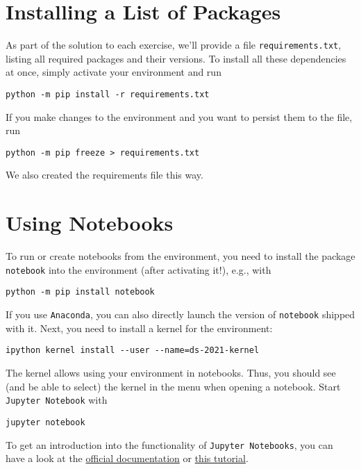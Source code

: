 \documentclass[12pt]{article}
\newcommand{\code}[1]{\textcolor{kitgreen}{\texttt{#1}}}
\begin{document}
\section{Installing a List of Packages}

As part of the solution to each exercise, we'll provide a file \code{requirements.txt}, listing all required packages and their versions.
To install all these dependencies at once, simply activate your environment and run
%
\begin{lstlisting}[style=cmdblock]
python -m pip install -r requirements.txt
\end{lstlisting}
%
If you make changes to the environment and you want to persist them to the file, run
%
\begin{lstlisting}[style=cmdblock]
python -m pip freeze > requirements.txt
\end{lstlisting}
%
We also created the requirements file this way.

\section{Using Notebooks}
\label{sec:notebooks}

To run or create notebooks from the environment, you need to install the package \code{notebook} into the environment (after activating it!), e.g., with
%
\begin{lstlisting}[style=cmdblock]
python -m pip install notebook
\end{lstlisting}
%
If you use \code{Anaconda}, you can also directly launch the version of \code{notebook} shipped with it.
Next, you need to install a kernel for the environment:
%
\begin{lstlisting}[style=cmdblock]
ipython kernel install --user --name=ds-2021-kernel
\end{lstlisting}
%
The kernel allows using your environment in notebooks.
Thus, you should see (and be able to select) the kernel in the menu when opening a notebook.
Start \code{Jupyter Notebook} with
%
\begin{lstlisting}[style=cmdblock]
jupyter notebook
\end{lstlisting}
%
To get an introduction into the functionality of \code{Jupyter Notebooks}, you can have a look at the \href{https://jupyter-notebook.readthedocs.io/en/stable/notebook.html#}{official documentation} or \href{https://realpython.com/jupyter-notebook-introduction/}{this tutorial}.
\end{document}
